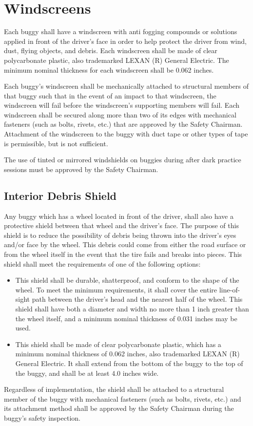 \section{Windscreens}

	Each buggy shall have a windscreen with anti fogging compounds or solutions
	applied in front of the driver's face in order to help protect the driver from
	wind, dust, flying objects, and debris. Each windscreen shall be made of clear
	polycarbonate plastic, also trademarked LEXAN (R) General Electric. The minimum
	nominal thickness for each windscreen shall be 0.062 inches.

	Each buggy's windscreen shall be mechanically attached to structural members of
	that buggy such that in the event of an impact to that windscreen, the
	windscreen will fail before the windscreen's supporting members will fail. Each
	windscreen shall be secured along more than two of its edges with mechanical
	fasteners (such as bolts, rivets, etc.) that are approved by the Safety
	Chairman. Attachment of the windscreen to the buggy with duct tape or other
	types of tape is permissible, but is not sufficient.

	The use of tinted or mirrored windshields on buggies during after dark practice
	sessions must be approved by the Safety Chairman.

\subsection{Interior Debris Shield}

	Any buggy which has a wheel located in front of the driver, shall also have a
	protective shield between that wheel and the driver's face. The purpose of this
	shield is to reduce the possibility of debris being thrown into the driver's
	eyes and/or face by the wheel. This debris could come from either the road
	surface or from the wheel itself in the event that the tire fails and breaks
	into pieces. This shield shall meet the requirements of one of the following
	options:

	\begin{itemize}

		\item
		This shield shall be durable, shatterproof, and conform to the shape of the wheel.
		To meet the minimum requirements, it shall cover the entire line-of-sight path
		between the driver’s head and the nearest half of the wheel. This shield shall
		have both a diameter and width no more than 1 inch greater than the wheel itself,
		and a minimum nominal thickness of 0.031 inches may be used.

		\item
		This shield shall be made of clear polycarbonate plastic, which has a minimum
		nominal thickness of 0.062 inches, also trademarked LEXAN (R) General Electric.
		It shall extend from the bottom of the buggy to the top of the buggy, and shall
		be at least 4.0 inches wide.

	\end{itemize}

	Regardless of implementation, the shield shall be attached to
	a structural member of the buggy with mechanical fasteners (such as bolts,
	rivets, etc.) and its attachment method shall be approved by the Safety Chairman
	during the buggy's safety inspection.
